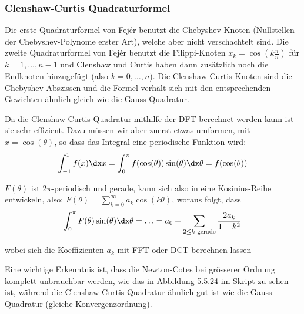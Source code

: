 \subsubsection{Clenshaw-Curtis Quadraturformel}
Die erste Quadraturformel von Fejér benutzt die Chebyshev-Knoten (Nullstellen der Chebyshev-Polynome erster Art), welche aber nicht verschachtelt sind.
Die zweite Quadraturformel von Fejér benutzt die Filippi-Knoten $x_k = \cos\left( k \frac{\pi}{n} \right)$ für $k = 1, \ldots, n - 1$
und Clenshaw und Curtis haben dann zusätzlich noch die Endknoten hinzugefügt (also $k = 0, \ldots, n$).
Die Clenshaw-Curtis-Knoten sind die Chebyshev-Abszissen und die Formel verhält sich mit den entsprechenden Gewichten ähnlich gleich wie die Gauss-Quadratur.

Da die Clenshaw-Curtis-Quadratur mithilfe der DFT berechnet werden kann ist sie sehr effizient.
Dazu müssen wir aber zuerst etwas umformen, mit $x = \cos(\theta)$, so dass das Integral eine periodische Funktion wird:
\rmvspace
\begin{align*}
    \int_{-1}^{1} f(x) \dx x = \int_{0}^{\pi} f(\cos(\theta)) \sin(\theta) \dx \theta = f(\cos(\theta))
\end{align*}

\drmvspace
$F(\theta)$ ist $2\pi$-periodisch und gerade, kann sich also in eine Kosinius-Reihe entwickeln, also: $F(\theta) = \sum_{k = 0}^{\infty} a_k \cos(k \theta)$, woraus folgt, dass
\drmvspace
\begin{align*}
    \int_{0}^{\pi} F(\theta) \sin(\theta) \dx \theta = \ldots = a_0 + \sum_{2 \leq k \text{ gerade}} \frac{2a_k}{1 - k^2}
\end{align*}

\drmvspace
wobei sich die Koeffizienten $a_k$ mit FFT oder DCT berechnen lassen


Eine wichtige Erkenntnis ist, dass die Newton-Cotes bei grösserer Ordnung komplett unbrauchbar werden, wie das in Abbildung 5.5.24 im Skript zu sehen ist,
während die Clenshaw-Curtis-Quadratur ähnlich gut ist wie die Gauss-Quadratur (gleiche Konvergenzordnung).

